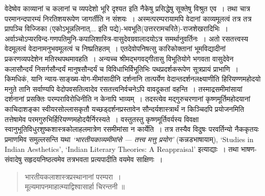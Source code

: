 {\dev वेदेष्वेव काव्यानां च कलानां च व्यपदेशो भूरि दृश्यत इति नैकेषु प्रसिद्धेषु सूक्तेषु विश्रुत एव~। तथा चात्र परमानन्दपारम्यं निरतिशयरूपेण जागर्तीति न संशयः~। अस्मत्परम्परायामपि वेदानां काव्यमूलत्वं तत्र तत्र प्रापञ्चि विज्जिका (एकोऽभून्नलिनात्... इति पद्ये)-भवभूति(उत्तर\-रामचरिते)-राजशेखरादिभिः~। अर्वाञ्चोऽप्यरविन्द-गणपतिमुनि-कपालिशास्त्रि-वासुदेव\-\-ग्रवालादयोऽत्र समर्थानुवर्तिनः~। अतो रसतत्त्वस्य वेदमूलत्वं वेदानामनुभवमूलत्वं च निष्प्रतिहतम्~।  एतदेवोपनिषत्सु कारिकोक्तानां भूमविद्यादीनां प्रकरणव्यपदेशेन मतिरथपथ\-मावहति~। अन्यच्च श्रीमद्भगवद्गीतासु विभूतियोगे भगवता वासुदेवेन कलासौन्दर्यं निसर्ग\-सौन्दर्यं मानुषसौन्दर्यं च विविधाभिर्विभूतिभिः पथप्रदर्शकरूपेण सूत्रप्रायं प्राभाणि~। किमधिकं, यानि न्याय-साङ्ख्य-योग-मीमांसादीनि दर्शनानि तात्पर्येण वेदान्तदर्शनलक्ष्याणीति हिरियण्ण\-महोदयो मनुते तानि सर्वाण्यपि वेदोपवसतित्वादेव रसतत्त्वनिर्वचनेऽपि वावदूकतां वहन्ति~। तस्माद्रसमीमांसायां दर्शनानां प्रसक्तिः परम्पराविरोधिनीति न केनापि भाव्यम्~। तदस्त्येव मद्गुरुचरणानां कृष्णमूर्तिमहोदयानां काचिदाशङ्का स्वीयरसोल्लासकृतौ यच्छड्दर्शनप्रस्तावेन सौन्दर्यशास्त्रार्थं न किञ्चिदपि प्रयोजनमिति तत्तेषामेव परमगुरुभिर्हिरियण्णमहोदयैर्निरस्यते~। वस्तुतस्तु कृष्णमूर्तिवर्यस्य विवक्षा स्वानुभूतिविधुरशुष्कशास्त्रकोलाहलमात्रेण रसमीमांसा न कार्येति~। तत्र तस्यैव विदुषः परवर्तिन्यो नैककृतयः प्रमाणमिव समुल्लसन्ति यथा} \textsl{\dev ‘भारतीय\-काव्यमीमांसे --- तत्त्व मत्तु प्रयोग’} {\dev (कन्नडभाषायाम्)}, `Studies in Indian Aesthetics', `Indian Literary Theories: A Reappraisal' {\dev इत्याद्याः~। तथा भाषण-संवादेषु सहृदयनिष्ठत्वमेव तत्रभवता प्रत्यपादीति वयमेव साक्षिणः~।} 
\begin{quote}
{\dev भारतीयकलाशास्त्रप्रस्थानानां परम्परा~।}\\
{\dev मूल्यमापनमाहात्म्याद्विश्वासार्हा चिरन्तनी ॥}
\end{quote}

